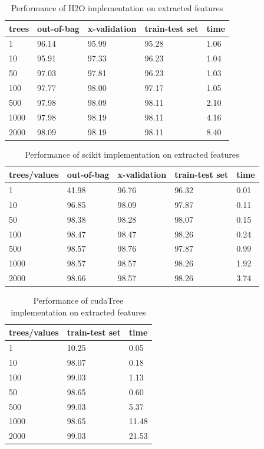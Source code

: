 \documentclass[thesis=B,english]{FITthesis}[2012/10/20]
\begin{document}
\begin{table}[h]
\begin{tabular}{|l|l|l|l|l|}
\hline
trees        & out-of-bag & x-validation & train-test set & time \\ \hline
1&96.14&95.99&95.28&1.06\\ \hline
10&95.91&97.33&96.23&1.04\\ \hline
50&97.03&97.81&96.23&1.03\\ \hline
100&97.77&98.00&97.17&1.05\\ \hline
500&97.98&98.09&98.11&2.10\\ \hline 
1000&97.98&98.19&98.11&4.16\\ \hline
2000&98.09&98.19&98.11&8.40\\ \hline
\end{tabular}
\caption{Performance of H2O implementation on extracted features}
\label{tab:h2o-extracted}
\end{table}
\begin{table}[h]
\begin{tabular}{|l|l|l|l|l|}
\hline
trees/values & out-of-bag & x-validation & train-test set & time \\ \hline
1&41.98&96.76&96.32&0.01\\ \hline
10&96.85&98.09&97.87&0.11\\ \hline
50&98.38&98.28&98.07&0.15\\ \hline 
100&98.47&98.47&98.26&0.24\\ \hline
500&98.57&98.76&97.87&0.99\\ \hline
1000&98.57&98.57&98.26&1.92\\ \hline
2000&98.66&98.57&98.26&3.74\\ \hline
\end{tabular}
\caption{Performance of scikit implementation on extracted features}
\label{tab:scikit-extracted}
\end{table}
\begin{table}[h]
\begin{tabular}{|l|l|l|}
\hline
trees/values & train-test set & time \\ \hline
1&10.25&0.05\\ \hline
10&98.07&0.18\\ \hline
100&99.03&1.13\\ \hline
50&98.65&0.60\\ \hline
500&99.03&5.37\\ \hline
1000&98.65&11.48\\ \hline
2000&99.03&21.53\\ \hline 

\end{tabular}
\caption{Performance of cudaTree implementation on extracted features}
\label{tab:cuda-extracted}
\end{table}
\end{document}
